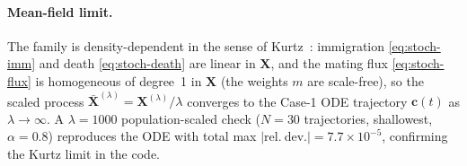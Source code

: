 \documentclass[11pt,a4paper]{article}
\begin{document}
\paragraph{Mean-field limit.}  The family is density-dependent in the
sense of Kurtz~\cite{kurtz-1970}: immigration \eqref{eq:stoch-imm} and
death \eqref{eq:stoch-death} are linear in $\mathbf X$, and the mating
flux \eqref{eq:stoch-flux} is homogeneous of degree~1 in $\mathbf X$
(the weights $m$ are scale-free), so the scaled process
$\bar{\mathbf X}^{(\lambda)}=\mathbf X^{(\lambda)}/\lambda$ converges
to the Case-1 ODE trajectory $\mathbf c(t)$ as $\lambda\to\infty$.
A $\lambda=1000$ population-scaled check ($N=30$ trajectories, shallowest,
$\alpha=0.8$) reproduces the ODE with total max
$|\mathrm{rel.\ dev.}|=7.7\times10^{-5}$, confirming the Kurtz limit
in the code.
\end{document}
